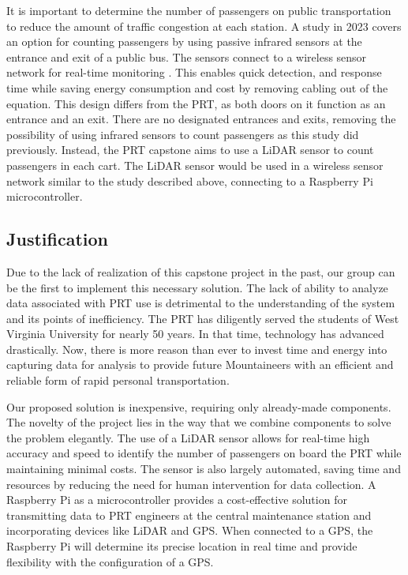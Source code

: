 It is important to determine the number of passengers on public transportation to reduce the amount of traffic congestion at each station. A study in 2023 covers an option for counting passengers by using passive infrared sensors at the entrance and exit of a public bus. The sensors connect to a wireless sensor network for real-time monitoring \cite{Jurak_Osman_Sikirić_Šimunović_2023}. This enables quick detection, and response time while saving energy consumption and cost by removing cabling out of the equation. This design differs from the PRT, as both doors on it function as an entrance and an exit. There are no designated entrances and exits, removing the possibility of using infrared sensors to count passengers as this study did previously. Instead, the PRT capstone aims to use a LiDAR sensor to count passengers in each cart. The LiDAR sensor would be used in a wireless sensor network similar to the study described above, connecting to a Raspberry Pi microcontroller.

\subsection{Justification}
Due to the lack of realization of this capstone project in the past, our group can be the first to implement this necessary solution. The lack of ability to analyze data associated with PRT use is detrimental to the understanding of the system and its points of inefficiency. The PRT has diligently served the students of West Virginia University for nearly 50 years. In that time, technology has advanced drastically. Now, there is more reason than ever to invest time and energy into capturing data for analysis to provide future Mountaineers with an efficient and reliable form of rapid personal transportation.
	
Our proposed solution is inexpensive, requiring only already-made components. The novelty of the project lies in the way that we combine components to solve the problem elegantly. The use of a LiDAR sensor allows for real-time high accuracy and speed to identify the number of passengers on board the PRT while maintaining minimal costs. The sensor is also largely automated, saving time and resources by reducing the need for human intervention for data collection. A Raspberry Pi as a microcontroller provides a cost-effective solution for transmitting data to PRT engineers at the central maintenance station and incorporating devices like LiDAR and GPS. When connected to a GPS, the Raspberry Pi will determine its precise location in real time and provide flexibility with the configuration of a GPS.
